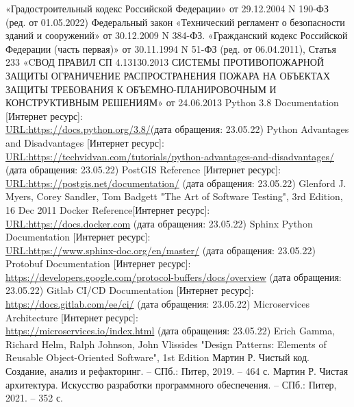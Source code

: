 
\begin{thebibliography}{8}
	«Градостроительный кодекс Российской Федерации» от 29.12.2004 N 190-ФЗ (ред. от 01.05.2022)
	Федеральный закон «Технический регламент о безопасности зданий и сооружений» от 30.12.2009 N 384-ФЗ.
	«Гражданский кодекс Российской Федерации (часть первая)» от 30.11.1994 N 51-ФЗ (ред. от 06.04.2011), Статья 233
	«CВОД ПРАВИЛ СП 4.13130.2013
	СИСТЕМЫ ПРОТИВОПОЖАРНОЙ ЗАЩИТЫ
	ОГРАНИЧЕНИЕ РАСПРОСТРАНЕНИЯ ПОЖАРА НА ОБЪЕКТАХ ЗАЩИТЫ
	ТРЕБОВАНИЯ
	К ОБЪЕМНО-ПЛАНИРОВОЧНЫМ И КОНСТРУКТИВНЫМ РЕШЕНИЯМ» от 24.06.2013
	 Python 3.8 Documentation [Интернет ресурс]:\\
	\url{URL:https://docs.python.org/3.8/}(дата обращения: 23.05.22)
	 Python Advantages and Disadvantages [Интернет ресурс]:\\
	\url{URL:https://techvidvan.com/tutorials/python-advantages-and-disadvantages/} (дата обращения: 23.05.22)
	 PostGIS Reference [Интернет ресурс]:\\
	\url{URL:https://postgis.net/documentation/} (дата обращения: 23.05.22)
	Glenford J. Myers, Corey Sandler, Tom Badgett "The Art of Software Testing", 3rd Edition, 16 Dec 2011
	 Docker Reference[Интернет ресурс]:\\
	\url{URL:https://docs.docker.com} (дата обращения: 23.05.22)
	 Sphinx Python Documentation [Интернет ресурс]:\\
	\url{URL:https://www.sphinx-doc.org/en/master/} (дата обращения: 23.05.22)
	 Protobuf Documentation [Интернет ресурс]:\\
	\url{https://developers.google.com/protocol-buffers/docs/overview} (дата обращения: 23.05.22)
	 Gitlab CI/CD Documentation [Интернет ресурс]:\\
	\url{https://docs.gitlab.com/ee/ci/} (дата обращения: 23.05.22)
	 Microservices Architecture [Интернет ресурс]:\\
	\url{https://microservices.io/index.html} (дата обращения: 23.05.22)
	Erich Gamma, Richard Helm, Ralph Johnson, John Vlissides
	"Design Patterns: Elements of Reusable Object-Oriented Software", 1st Edition
	Мартин Р. Чистый код. Создание, анализ и рефакторинг. – СПб.: Питер, 2019. – 464 с.
	Мартин Р. Чистая архитектура. Искусство разработки программного обеспечения. – СПб.: Питер, 2021. – 352 с.
\end{thebibliography}
